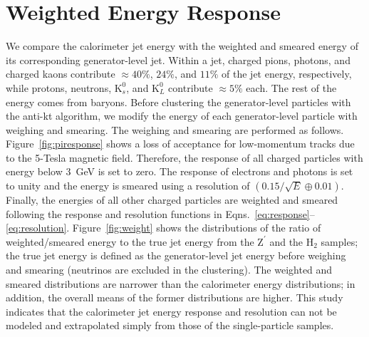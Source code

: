 \documentclass{PoS}
\begin{document}
\section{Weighted Energy Response \label{sec:weight}}
We compare the calorimeter jet energy with the weighted 
and smeared energy of its corresponding generator-level jet. 
Within a jet, charged pions, photons, and charged kaons 
contribute $\approx 40\%$, $24\%$, and $11\%$ of the jet energy, respectively, 
while protons, neutrons, $\mathrm{K}_{s}^0$, and $\mathrm{K}_{L}^0$ contribute 
$\approx 5\%$ each. The rest of the energy comes from baryons. 
Before clustering the generator-level particles with the anti-kt algorithm, 
we modify the energy of each generator-level particle with weighing and 
smearing. The weighing and smearing are performed as follows. 
Figure~\ref{fig:piresponse} shows a 
loss of acceptance for low-momentum tracks due to the 5-Tesla magnetic field. 
Therefore, the response of all charged particles with energy below 3~GeV is 
set to zero. The response of electrons and photons 
is set to unity and the energy is smeared using a resolution 
of $\left(0.15/\sqrt{E} \oplus 0.01\right)$. Finally, the energies
of all other charged particles are weighted and smeared 
following the response and resolution functions in 
Eqns.~\ref{eq:response}--\ref{eq:resolution}. 
%
Figure~\ref{fig:weight} shows the distributions of the ratio of 
weighted/smeared energy to the true jet energy from the $\mathrm{Z}^{\prime}$ 
and the $\mathrm{H}_2$ samples; the true jet energy is defined as the 
generator-level jet energy before weighing and smearing (neutrinos are 
excluded in the clustering). The weighted and smeared distributions are 
narrower than the calorimeter energy distributions; in addition, the overall 
means of the former distributions are higher. This study indicates that the 
calorimeter jet energy response and resolution can not be modeled and 
extrapolated simply from those of the single-particle samples.

\end{document}
